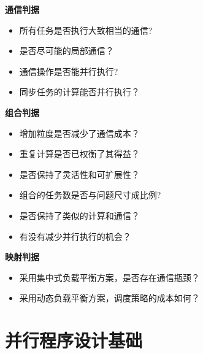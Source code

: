 \documentclass[UTF8,a4paper]{ctexart}
\begin{document}
\textbf{通信判据}
\begin{itemize}
  \item 所有任务是否执行大致相当的通信?
  \item 是否尽可能的局部通信？
  \item 通信操作是否能并行执行?
  \item 同步任务的计算能否并行执行？
\end{itemize}

\textbf{组合判据}
\begin{itemize}
  \item 增加粒度是否减少了通信成本？
  \item 重复计算是否已权衡了其得益？
  \item 是否保持了灵活性和可扩展性？
  \item 组合的任务数是否与问题尺寸成比例?
  \item 是否保持了类似的计算和通信？
  \item 有没有减少并行执行的机会？
\end{itemize}
\textbf{映射判据}
\begin{itemize}
  \item 采用集中式负载平衡方案，是否存在通信瓶颈？
  \item 采用动态负载平衡方案，调度策略的成本如何？
\end{itemize}

\section{并行程序设计基础}
\end{document}
